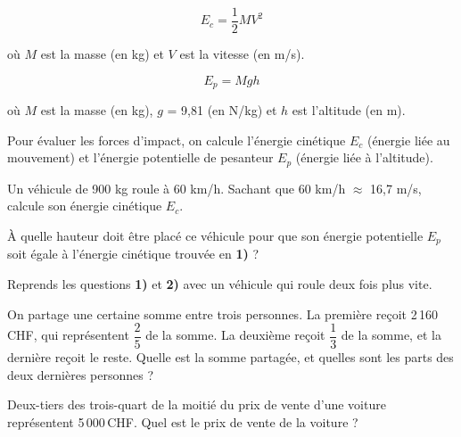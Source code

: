 \begin{exercice}

\begin{cadre}

\vspace{.5em}

\[E_c = \dfrac{1}{2} MV^2\]

où $M$ est la masse (en kg) et $V$ est la vitesse (en m/s).

\vspace{1em}

\[E_p = Mgh\]

où $M$ est la masse (en kg), $g$ = 9,81 (en N/kg) et $h$ est l'altitude (en m).

\vspace{.5em}

\end{cadre}


Pour évaluer les forces d'impact, on calcule l'énergie cinétique $E_c$ (énergie liée au mouvement) et l'énergie potentielle de pesanteur $E_p$  (énergie liée à l'altitude).

\begin{colenumerate}{1} 
\item Un véhicule de 900 kg roule à 60 km/h. Sachant que 60 km/h $\approx$ 16,7 m/s, calcule son énergie cinétique $E_c$.
\item À quelle hauteur doit être placé ce véhicule pour que son énergie potentielle $E_p$ soit égale à l'énergie cinétique trouvée en \textbf{1)} ?
\item Reprends les questions \textbf{1)} et \textbf{2)} avec un véhicule qui roule deux fois plus vite.
\end{colenumerate} 
\end{exercice}



\begin{exercice}[Partage...]
On partage une certaine somme entre trois personnes. La première reçoit 2\,160\,CHF, qui représentent $\dfrac{2}{5}$ de la somme. La deuxième reçoit $\dfrac{1}{3}$ de la somme, et la dernière reçoit le reste. Quelle est la somme partagée, et quelles sont les parts des deux dernières personnes ?
\end{exercice}



\begin{exercice}[]
Deux-tiers des trois-quart de la moitié du prix de vente d'une voiture représentent 5\,000\,CHF. Quel est le prix de vente de la voiture ?
\end{exercice}



